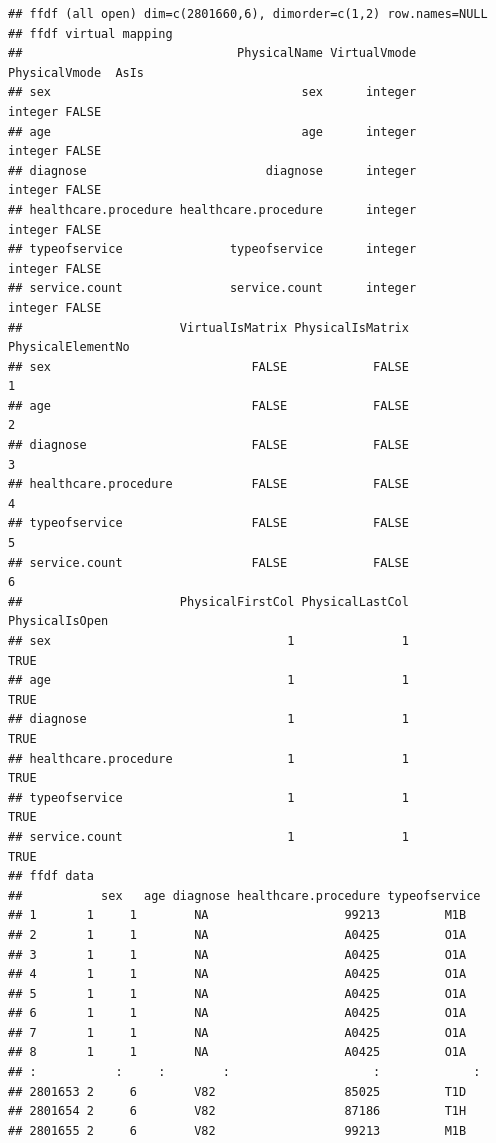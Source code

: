\documentclass[]{book}
\theoremstyle{definition}
\theoremstyle{definition}
\theoremstyle{definition}
\theoremstyle{remark}
\begin{document}
\begin{verbatim}
## ffdf (all open) dim=c(2801660,6), dimorder=c(1,2) row.names=NULL
## ffdf virtual mapping
##                              PhysicalName VirtualVmode PhysicalVmode  AsIs
## sex                                   sex      integer       integer FALSE
## age                                   age      integer       integer FALSE
## diagnose                         diagnose      integer       integer FALSE
## healthcare.procedure healthcare.procedure      integer       integer FALSE
## typeofservice               typeofservice      integer       integer FALSE
## service.count               service.count      integer       integer FALSE
##                      VirtualIsMatrix PhysicalIsMatrix PhysicalElementNo
## sex                            FALSE            FALSE                 1
## age                            FALSE            FALSE                 2
## diagnose                       FALSE            FALSE                 3
## healthcare.procedure           FALSE            FALSE                 4
## typeofservice                  FALSE            FALSE                 5
## service.count                  FALSE            FALSE                 6
##                      PhysicalFirstCol PhysicalLastCol PhysicalIsOpen
## sex                                 1               1           TRUE
## age                                 1               1           TRUE
## diagnose                            1               1           TRUE
## healthcare.procedure                1               1           TRUE
## typeofservice                       1               1           TRUE
## service.count                       1               1           TRUE
## ffdf data
##           sex   age diagnose healthcare.procedure typeofservice
## 1       1     1        NA                   99213         M1B  
## 2       1     1        NA                   A0425         O1A  
## 3       1     1        NA                   A0425         O1A  
## 4       1     1        NA                   A0425         O1A  
## 5       1     1        NA                   A0425         O1A  
## 6       1     1        NA                   A0425         O1A  
## 7       1     1        NA                   A0425         O1A  
## 8       1     1        NA                   A0425         O1A  
## :           :     :        :                    :             :
## 2801653 2     6        V82                  85025         T1D  
## 2801654 2     6        V82                  87186         T1H  
## 2801655 2     6        V82                  99213         M1B  

\end{verbatim}
\end{document}
